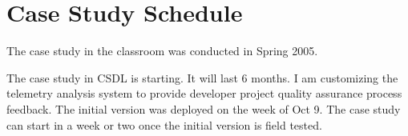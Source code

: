 \begin{itemize}
	
	
	
\end{itemize}




%
%





\section{Case Study Schedule} \label{EvaluationStrategy:Schedule}

The case study in the classroom was conducted in Spring 2005. 

The case study in CSDL is starting. It will last 6 months. I am customizing the telemetry analysis system to provide developer project quality assurance process feedback. The initial version was deployed on the week of Oct 9. The case study can start in a week or two once the initial version is field tested.

